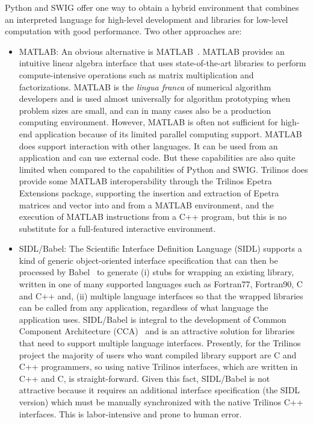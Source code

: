 \documentclass[10pt,relax]{SANDreport}
\begin{document}
Python and SWIG offer one way to obtain a hybrid environment that
combines an interpreted language for high-level development and
libraries for low-level computation with good performance.  Two
other approaches are:
\begin{itemize}
    \item MATLAB: An obvious alternative is MATLAB~\cite{Matlab-home-page}.
    MATLAB provides an intuitive linear algebra interface that uses
    state-of-the-art libraries to perform compute-intensive operations
such as matrix multiplication and factorizations.  MATLAB is the
{\it lingua franca} of numerical algorithm developers and is used
almost universally for algorithm prototyping when problem sizes are
small, and can in many cases also be a production computing
environment. However, MATLAB is often not sufficient for high-end
application because of its limited parallel computing support.
MATLAB does support interaction with other languages.  It can be
used from an application and can use external code.  But these
capabilities are also quite limited when compared to the
capabilities of Python and SWIG.  Trilinos does provide  some MATLAB
interoperability through the Trilinos Epetra Extensions package,
supporting the insertion and extraction of Epetra matrices and
vector into and from a MATLAB environment, and the execution of
MATLAB instructions from a C++ program, but this is no substitute
for a full-featured interactive environment.
    \item SIDL/Babel: The Scientific Interface Definition Language
    (SIDL) supports a kind of generic object-oriented interface
    specification that can then be processed by Babel~\cite{Babel-home-page}
    to generate (i) stubs for
    wrapping an existing library, written in one of many supported
    languages such as Fortran77, Fortran90, C and C++ and, (ii)
    multiple language interfaces so that the wrapped
    libraries can be called from any application, regardless of what
    language the application uses.  SIDL/Babel is integral to the
    development of Common Component Architecture (CCA)~\cite{cca}
    and is an attractive solution for libraries that need to support
    multiple language interfaces.  Presently, for the Trilinos project the
    majority of users who want compiled library support
    are C and C++ programmers, so using native Trilinos interfaces,
    which are written in C++ and C, is straight-forward.
    Given this fact, SIDL/Babel is not attractive because it
    requires an additional interface specification (the SIDL version)
    which must be
    manually synchronized with the native Trilinos C++ interfaces.
    This is labor-intensive and prone to human error.
\end{itemize}
\end{document}
